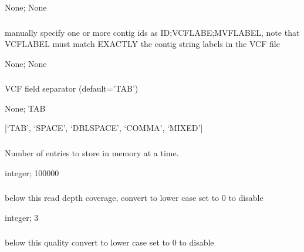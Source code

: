 \documentclass[letterpaper,11pt,english]{sphinxmanual}
\begin{document}
 None;  None


\subsubsection{}
\label{\detokenize{prog_desc:id37}}
 manually specify one or more contig ids as ID;VCFLABE;MVFLABEL, note that VCFLABEL must match EXACTLY the contig string labels in the VCF file

 None;  None


\subsubsection{}
\label{\detokenize{prog_desc:id38}}
 VCF field separator (default=’TAB’)

 None;  TAB

 {[}‘TAB’, ‘SPACE’, ‘DBLSPACE’, ‘COMMA’, ‘MIXED’{]}


\subsubsection{}
\label{\detokenize{prog_desc:id39}}
 Number of entries to store in memory at a time.

 integer;  100000


\subsubsection{}
\label{\detokenize{prog_desc:low-depth-lowdepth}}
 below this read depth coverage, convert to lower case set to 0 to disable

 integer;  3


\subsubsection{}
\label{\detokenize{prog_desc:low-qual-lowqual}}
 below this quality convert to lower case set to 0 to disable
\end{document}
